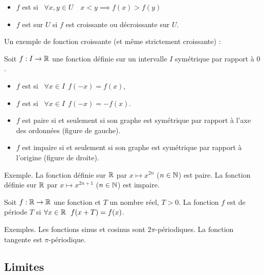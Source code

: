 \documentclass[10pt,class=article,crop=false]{standalone}
\begin{document}
\begin{multicols}{2}
\begin{itemize}
	\item $f$ est  si
	\ $\forall x,y\in U \quad  x< y \implies f(x)> f(y)$
	
	\item $f$ est   sur $U$ si
	$f$ est croissante ou décroissante  sur $U$.
\end{itemize}

Un exemple de fonction croissante (et même strictement croissante) :


Soit $f:I\to \mathbb{R}$ une fonction définie sur un intervalle $I$ symétrique par rapport à $0$.
\begin{itemize}
	\item $f$ est  si \ $\forall x\in I \ \ f(-x)=f(x)$,
	\item $f$ est  si \ $\forall x\in I \ \ f(-x)=-f(x)$.
\end{itemize}

\begin{itemize}
\item $f$ est paire si et seulement si son graphe est symétrique par rapport à l'axe des ordonnées (figure de gauche).
\item $f$ est impaire si et seulement si son graphe est symétrique par rapport à l'origine (figure de droite).
\end{itemize}



Exemple.
La fonction définie sur $\mathbb{R}$ par $x\mapsto x^{2n}$ ($n\in\mathbb{N}$) est paire.
La fonction définie sur $\mathbb{R}$ par $x\mapsto x^{2n+1}$ ($n\in\mathbb{N}$) est impaire.



Soit $f:\mathbb{R} \to \mathbb{R}$ une fonction et $T$ un nombre réel, $T>0$.
La fonction $f$ est  de période $T$ si 
$\forall x\in\Rr \ \  f(x+T)=f(x)$.



Exemples. Les fonctions sinus et cosinus sont $2\pi$-périodiques. La fonction tangente est $\pi$-périodique.



\subsection{Limites}



\end{multicols}
\end{document}
